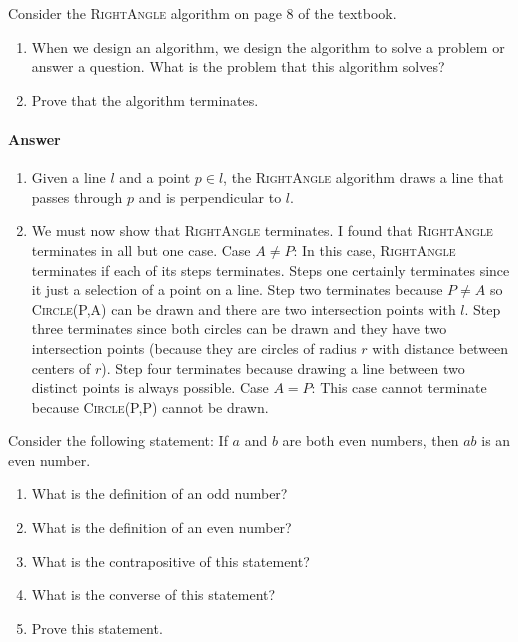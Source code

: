 \documentclass{article}
\begin{document}
Consider the \textsc{RightAngle} algorithm on page 8 of the textbook.
\begin{enumerate}
    \item When we design an algorithm, we design the algorithm to solve a
        problem or answer a question.  What is the problem that this algorithm
        solves?
    \item Prove that the algorithm terminates.
\end{enumerate}

\paragraph{Answer}


\begin{enumerate}
    \item Given a line $l$ and a point $p \in l$, the \textsc{RightAngle} algorithm draws a line that passes through $p$ and is perpendicular to $l$.
    \item We must now show that \textsc{RightAngle} terminates.
    I found that \textsc{RightAngle} terminates in all but one case. \parspace
    Case $A \neq P$: In this case, \textsc{RightAngle} terminates if each of its steps terminates.
    Steps one certainly terminates since it just a selection of a point on a line.
    Step two terminates because $P \neq A$ so \textsc{Circle(P,A)} can be drawn and there are two intersection points with $l$.
    Step three terminates since both circles can be drawn and they have two intersection points (because they are circles of radius $r$ with distance between centers of $r$).
    Step four terminates because drawing a line between two distinct points is always possible. \parspace
    Case $A = P$: This case cannot terminate because \textsc{Circle(P,P)} cannot be drawn.
\end{enumerate}




\nextprob
{}

Consider the following statement: If $a$ and $b$ are both even numbers, then $ab$ is
an even number.
\begin{enumerate}
    \item What is the definition of an odd number?
    \item What is the definition of an even number?
    \item What is the contrapositive of this statement?
    \item What is the converse of this statement?
    \item Prove this statement.
\end{enumerate}
\end{document}
